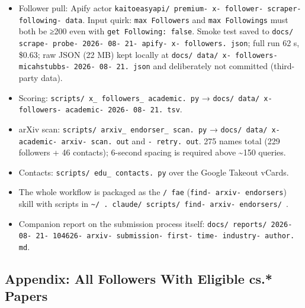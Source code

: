 \documentclass[twocolumn,10pt,letterpaper]{article}
\begin{document}
\begin{itemize}
\setlength{\itemsep}{0pt}
\setlength{\parskip}{0pt}
  \item Follower pull: Apify actor \texttt{kaitoeasyapi/ premium- x- follower- scraper- following- data}. Input quirk: \texttt{max Followers} and \texttt{max Followings} must both be ≥200 even with \texttt{get Following: false}. Smoke test saved to \texttt{docs/ scrape- probe- 2026- 08- 21- apify- x- followers. json}; full run 62 s, \$0.63; raw JSON (22 MB) kept locally at \texttt{docs/ data/ x- followers- micahstubbs- 2026- 08- 21. json} and deliberately not committed (third-party data).
  \item Scoring: \texttt{scripts/ x\_ followers\_ academic. py} → \texttt{docs/ data/ x- followers- academic- 2026- 08- 21. tsv}.
  \item arXiv scan: \texttt{scripts/ arxiv\_ endorser\_ scan. py} → \texttt{docs/ data/ x- academic- arxiv- scan. out} and \texttt{- retry. out}. 275 names total (229 followers + 46 contacts); 6-second spacing is required above \textasciitilde{}150 queries.
  \item Contacts: \texttt{scripts/ edu\_ contacts. py} over the Google Takeout vCards.
  \item The whole workflow is packaged as the \texttt{/ fae} (\texttt{find- arxiv- endorsers}) skill with scripts in \texttt{\textasciitilde{}/ . claude/ scripts/ find- arxiv- endorsers/ }.
  \item Companion report on the submission process itself: \texttt{docs/ reports/ 2026- 08- 21- 104626- arxiv- submission- first- time- industry- author. md}.
\end{itemize}

\subsection{Appendix: All Followers With Eligible cs.* Papers}
\end{document}
